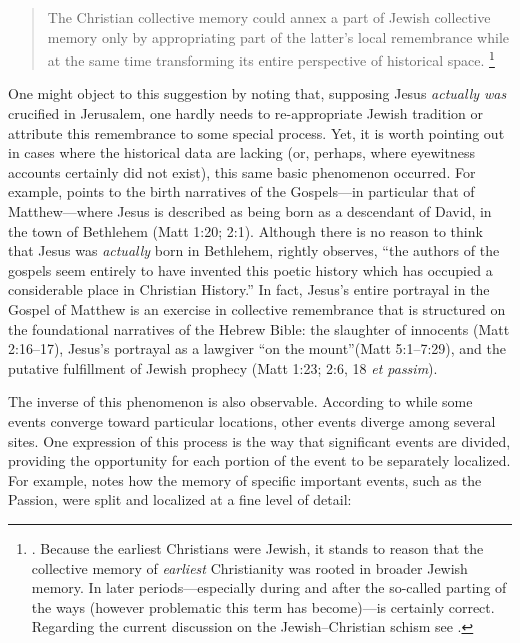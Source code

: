 \begin{quote}
    The Christian collective memory could annex a part of Jewish collective memory only by appropriating part of the latter's local remembrance while at the same time transforming its entire perspective of historical space.%
        \footnote{%
        \Cite[215]{halbwachs1992}.
        Because the earliest Christians were Jewish, it stands to reason that the collective memory of \emph{earliest} Christianity was rooted in broader Jewish memory. In later periods---especially during and after the so-called parting of the ways (however problematic this term has become)---\halbwachs is certainly correct. Regarding the current discussion on the Jewish--Christian schism see 
        \cite[19--60]{burns2016}.}
\end{quote}  
\noindent
One might object to this suggestion by noting that, supposing Jesus \emph{actually was} crucified in Jerusalem, one hardly needs to re-appropriate Jewish tradition or attribute this remembrance to some special process. Yet, it is worth pointing out in cases where the historical data are lacking (or, perhaps, where eyewitness accounts certainly did not exist), this same basic phenomenon occurred. For example, \halbwachs points to the birth narratives of the Gospels---in particular that of Matthew---where Jesus is described as being born as a descendant of David, in the town of Bethlehem (Matt 1:20; 2:1). Although there is no reason to think that Jesus was \emph{actually} born in Bethlehem, \halbwachs rightly observes, ``the authors of the gospels seem entirely to have invented this poetic history which has occupied a considerable place in Christian History.''%
    \autocite[214]{halbwachs1992}
In fact, Jesus's entire portrayal in the Gospel of Matthew is an exercise in collective remembrance that is structured on the foundational narratives of the Hebrew Bible: the slaughter of innocents (Matt 2:16--17), Jesus's portrayal as a lawgiver ``on the mount''(Matt 5:1--7:29), and the putative fulfillment of Jewish prophecy (Matt 1:23; 2:6, 18 \emph{et passim}). 

The inverse of this phenomenon is also observable. According to \halbwachs while some events converge toward particular locations, other events diverge among several sites. One expression of this process is the way that significant events are divided, providing the opportunity for each portion of the event to be separately localized. For example, \halbwachs notes how the memory of specific important events, such as the Passion, were split and localized at a fine level of detail:  

